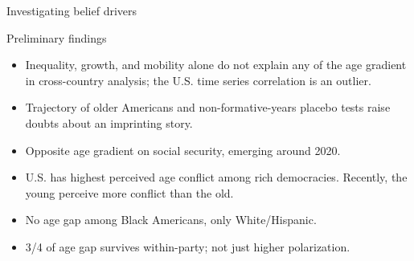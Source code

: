 \documentclass{beamer}
\begin{document}





\begin{frame}{Investigating belief drivers}


Preliminary findings
\begin{itemize}
    \item Inequality, growth, and mobility alone do not explain any of the age gradient in cross-country analysis; the U.S. time series correlation is an outlier. 
    \item Trajectory of older Americans and non-formative-years placebo tests raise doubts about an imprinting story.
    \item Opposite age gradient on social security, emerging around 2020. 
    \item U.S. has highest perceived age conflict among rich democracies. Recently, the young perceive more conflict than the old.
    \item No age gap among Black Americans, only White/Hispanic.
    \item 3/4 of age gap survives within-party; not just higher polarization.
\end{itemize}
    
\end{frame}
\end{document}
